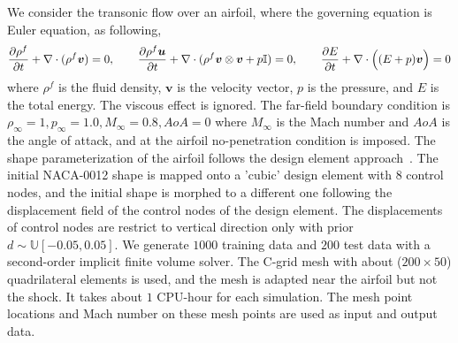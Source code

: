 \documentclass{article}
\newcommand{\I}{\mathbb{I}}
\begin{document}
We consider the transonic flow over an airfoil, where the governing equation is Euler equation, as following, 
\begin{align*}
\frac{\partial \rho^f}{\partial t} + \nabla \cdot (\rho^f \bm{v}) = 0, \quad \quad
\frac{\partial \rho^f\bm{u}}{\partial t} + \nabla \cdot (\rho^f \bm{v} \otimes \bm{v} + p \I) = 0, \quad \quad
\frac{\partial E}{\partial t} + \nabla \cdot  \Bigl( (E + p)\bm{v} \Bigr) = 0 
\end{align*}
where $\rho^f$ is the fluid density, $\bm{v}$ is the velocity vector, $p$ is the pressure, and $E$ is the total energy. The viscous effect is ignored. The far-field boundary condition is 
$\rho_{\infty} = 1 , p_{\infty}  = 1.0 , M_{\infty} = 0.8 , AoA = 0$
where $M_{\infty}$ is the Mach number and $AoA$ is the angle of attack, and at the airfoil no-penetration condition is imposed. 
The shape parameterization of the airfoil follows the design element approach~\cite{farin2014curves}.
The initial NACA-0012 shape is mapped onto a 'cubic' design element with $8$ control nodes, and the initial shape is morphed to a different one following the displacement field of the control nodes of the design element. The displacements of control nodes are restrict to vertical direction only with prior $d\sim \mathbb{U}[-0.05, 0.05]$.
We generate $1000$ training data and $200$ test data with a second-order implicit finite volume solver. The C-grid mesh with about ($200 \times 50$) quadrilateral elements is used, and the mesh is adapted near the airfoil but not the shock.
It takes about $1$ CPU-hour for each simulation.
The mesh point locations and Mach number on these mesh points are used as input and output data. 
\end{document}
